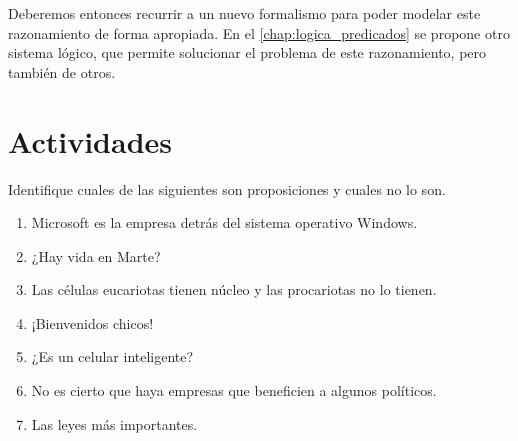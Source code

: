 Deberemos entonces recurrir a un nuevo formalismo para poder modelar este
razonamiento de forma apropiada. En el \autoref{chap:logica_predicados} se
propone otro sistema lógico, que permite solucionar el problema de este
razonamiento, pero también de otros.

\section{Actividades}
\label{chap:logica_proposicional:sec:actividades}

\begin{exercise}
    Identifique cuales de las siguientes son proposiciones y cuales no lo son.

    \begin{enumerate}[a]
        \item Microsoft es la empresa detrás del sistema operativo Windows.
        \item ¿Hay vida en Marte?
        \item Las células eucariotas tienen núcleo y las procariotas no lo
        tienen.
        \item ¡Bienvenidos chicos!
        \item ¿Es un celular inteligente?
        \item No es cierto que haya empresas que beneficien a algunos políticos.
        \item Las leyes más importantes.
    \end{enumerate}
\end{exercise}

